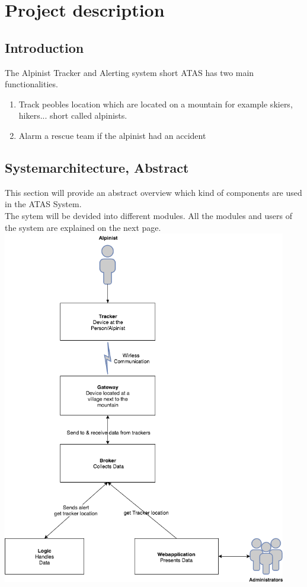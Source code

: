 \documentclass[a4paper,11pt, oneside]{report}
\theoremstyle{definition}
\begin{document}
\chapter{Project description}

\section{Introduction}
The Alpinist Tracker and Alerting system short ATAS has two main functionalities.
\begin{enumerate}
\item Track peobles location which are located on a mountain for example skiers, hikers... short called alpinists.
\item Alarm a rescue team if the alpinist had an accident
\end{enumerate}


\newpage
\section{Systemarchitecture, Abstract}
This section will provide an abstract overview which kind of components are used in the ATAS System.\\
The sytem will be devided into different modules. All the modules and users of the system are explained on the next page.\\

\includegraphics[width=0.93\textwidth]{img/ATAS_SystemOverview_Abstract.png}
\end{document}
